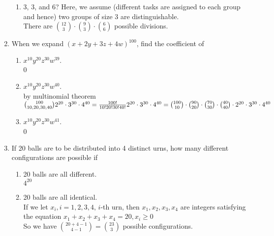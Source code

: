 \documentclass[12pt]{article}%
\newcommand{\0}{{\bf 0}}
\begin{document}
\begin{enumerate}
\begin{enumerate}
\item 3, 3, and 6? {\color{red}Here, we assume (different tasks are assigned to each group and hence) two groups of size 3 are distinguishable.} 
\\
{\color{blue}{\bf Sol.}}
There are ${{12\choose 3}\cdot{9\choose 3}\cdot{6\choose 6}}$ possible divisions.
\end{enumerate}



\item
When we expand $(x+2y+3z+4w)^{100}$,
find the coefficient of
\begin{enumerate}
\item $x^{10}y^{20}z^{30}w^{39}$.
\\
{\color{blue}{\bf Sol.}} 0


\item $x^{10}y^{20}z^{30}w^{40}$.
\\
{\color{blue}{\bf Sol.}} by multinomial theorem\\
 ${100 \choose 10,20,30,40}2^{20}\cdot3^{30}\cdot4^{40}=\frac{100!}{10!20!30!40!}2^{20}\cdot3^{30}\cdot4^{40}={100 \choose 10}\cdot{90\choose 20}\cdot{70\choose 30}\cdot{40\choose 40}\cdot2^{20}\cdot3^{30}\cdot4^{40}$

 
 
 
\item $x^{10}y^{20}z^{30}w^{41}$.
\\
{\color{blue}{\bf Sol.}} 0
\end{enumerate}





\item 
If 20 balls are to be distributed into 4 distinct urns, 
how many different configurations are possible if
\begin{enumerate}
\item 20 balls are all different.
\\
{\color{blue}{\bf Sol.}}
$4^{20}$

\item 20 balls are all identical.
\\
{\color{blue}{\bf Sol.}}
If we let $x_i, i = 1, 2, 3, 4$, $i$-th urn, then $x_1, x_2, x_3, x_4$ are integers satisfying the equation $x_1+x_2+x_3+x_4=20, x_i \ge 0$
\\So we have ${20+4-1\choose 4-1}={23\choose 3}$ possible configurations.


\end{enumerate}
\end{enumerate}
\end{document}
